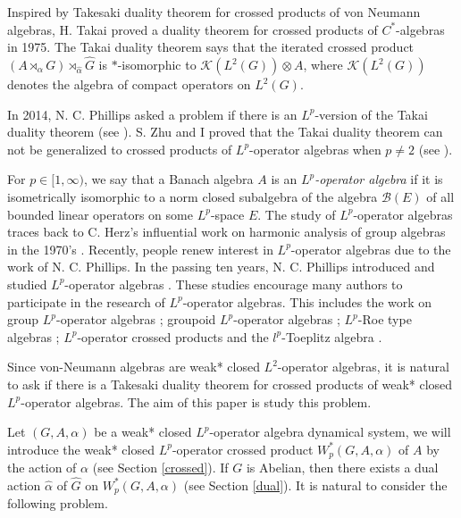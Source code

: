 \documentclass[reqno,11pt]{amsart}
\theoremstyle{plain}
\theoremstyle{definition}
\theoremstyle{remark}
\begin{document}
Inspired by Takesaki duality theorem for crossed products of von Neumann algebras, H. Takai proved a duality theorem for crossed products of $C^*$-algebras in 1975. The Takai duality theorem says that the iterated crossed product $(A\rtimes_{\alpha}G)\rtimes _{\hat{\alpha}}\hat{G}$ is $*$-isomorphic to $\mathcal{K}(L^{2}(G))\otimes A$,
where $\mathcal{K}(L^{2}(G))$ denotes the algebra of compact operators on $L^{2}(G)$.

In 2014, N. C. Phillips asked a problem if there is an $L^p$-version of the Takai duality theorem (see \cite[Problem 8.7]{PlpsOpenQues}). S. Zhu and I proved that the Takai duality theorem can not be generalized to crossed products of $L^p$-operator algebras when $p\neq 2$ (see \cite{WZ}).

For $p\in[1,\infty)$, we say that a Banach algebra $A$ is an {\it $L^{p}$-operator algebra} if
it is isometrically isomorphic to a norm closed subalgebra of the algebra $\mathcal{B}(E)$ of all bounded linear operators on some $L^p$-space $E$.
The study of $L^p$-operator algebras traces back to C. Herz's influential work on harmonic analysis of group algebras in the 1970's \cite{Herz,Herz1,Herz2}.
Recently, people renew interest in $L^p$-operator algebras due to the work of N. C. Phillips.
In the passing ten years, N. C. Phillips  introduced and studied $L^p$-operator algebras \cite{Phillips Lp Cuntz,Odp,Lp UHF,N. C. Phillips Lp, PlpsOpenQues,Phillips look like,Lp AF}. These studies encourage many authors to participate in the research of $L^p$-operator algebras. This includes the work on group $L^p$-operator algebras \cite{Gardella and Thiel,Z}; groupoid $L^p$-operator algebras \cite{Gardella and Lupini groupoid}; $L^p$-Roe type algebras \cite{Chung}; $L^p$-operator crossed products \cite{Gardella and Thiel convolution,WZ,WZ2} and the $l^p$-Toeplitz algebra \cite{WW}.




Since von-Neumann algebras are weak* closed $L^2$-operator algebras, it is natural to ask if there is a  Takesaki duality theorem for crossed products of weak* closed $L^p$-operator algebras.
The aim of this paper is study this problem.


Let $(G,A,\alpha)$ be a weak* closed $L^p$-operator algebra dynamical system, we will introduce the weak* closed $L^p$-operator crossed product $W^*_p(G,A,\alpha)$ of $A$ by the action of $\alpha$ (see Section \ref{crossed}). If $G$ is Abelian, then there exists a dual action $\hat{\alpha}$ of $\hat{G}$ on $W^*_p(G,A,\alpha)$ (see Section \ref{dual}).
It is natural to consider the following problem.
\end{document}
